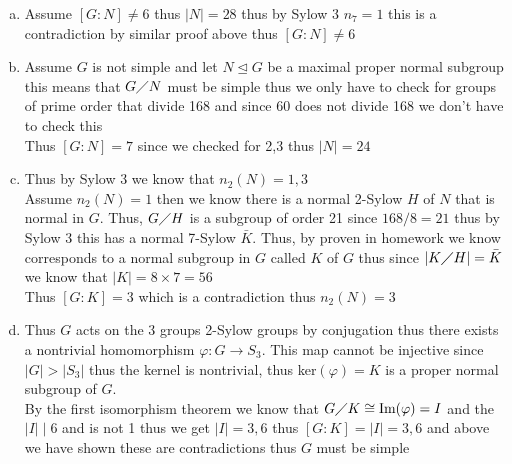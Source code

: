 \documentclass[12pt, letterpaper]{article}
\theoremstyle{definition}
\renewcommand{\t}[1]{\text{#1}}
\newcommand{\ang}[1]{\left\langle #1 \right\rangle}
\begin{document}
\begin{enumerate}[(a)]
Thus by group closure it contains element $u=xy^2x$ s.t. $H=\ang{x}$ and $K=\ang{y}$\\
$u=AB^2A$\\
$u^2=xy^2xxy^2x=xy^2x^2y^2x$\\
$u^3=xy^2x^2y^2xxy^2x=xy^2x^2y^2x^2y^2x=AB^2A^2B^2A^2B^2A=I$\\
This is a contradiction since $N$ is a group of order 56 and 3 does not divide 56 thus it cannot have a subgroup of order 3 thus $[G : N] \neq 3$
\item Assume $[G : N] \neq 6$ thus $|N|=28$ thus by Sylow 3 $n_7=1$ this is a contradiction by similar proof above thus $[G : N] \neq 6$
\item Assume $G$ is not simple and let $N \unlhd G$ be a maximal proper normal subgroup this means that $G \diagup N$ must be simple thus we only have to check for groups of prime order that divide 168 and since $60$ does not divide 168 we don't have to check this\\
Thus $[G:N]=7$ since we checked for 2,3 thus $|N|=24$
\item Thus by Sylow 3 we know that $n_2(N)=1,3$\\
Assume $n_2(N)=1$ then we know there is a normal 2-Sylow $H$ of $N$ that is normal in $G$. Thus, $G \diagup H$ is a subgroup of order 21 since $168/8=21$ thus by Sylow 3 this has a normal 7-Sylow $\bar{K}$. Thus, by proven in homework we know
corresponds to a normal subgroup in $G$ called $K$ of $G$ thus since $|K \diagup  H|=\bar{K}$ we know that $|K|=8\times 7=56$\\
Thus $[G : K]=3$ which is a contradiction thus $n_2(N)=3$\\
\item Thus $G$ acts on the 3 groups 2-Sylow groups by conjugation thus there exists a nontrivial homomorphism $\varphi : G \rightarrow S_3$. This map cannot be injective since  $|G|>|S_3|$ thus the
kernel is nontrivial, thus ker$(\varphi)=K$ is a proper normal subgroup of $G$.\\
By the first isomorphism theorem we know that $G \diagup K \cong \t{Im}(\varphi)=I$ and the $ |I| \mid 6$ and is not 1 thus we get $|I|=3,6$ thus $[G : K]=|I|=3,6$ and above we have shown these are contradictions thus $G$ must be simple
\end{enumerate}

\newpage
\end{document}
